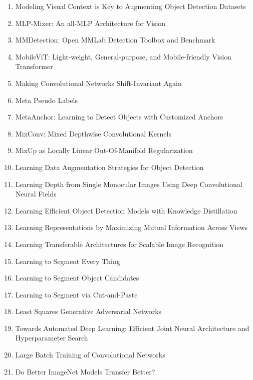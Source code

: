 \documentclass[acmlarge]{acmart}
\begin{document}
\begin{enumerate}
	\item Modeling Visual Context is Key to Augmenting Object Detection Datasets \cite{Dvornik2018ModelingVC}
	\item MLP-Mixer: An all-MLP Architecture for Vision \cite{Tolstikhin2021MLPMixerAA}
	\item MMDetection: Open MMLab Detection Toolbox and Benchmark \cite{Chen2019MMDetectionOM}
	\item MobileViT: Light-weight, General-purpose, and Mobile-friendly Vision Transformer \cite{Mehta2021MobileViTLG}
	\item Making Convolutional Networks Shift-Invariant Again \cite{Zhang2019MakingCN}
	\item Meta Pseudo Labels \cite{Pham2021MetaPL}
	\item MetaAnchor: Learning to Detect Objects with Customized Anchors \cite{Yang2018MetaAnchorLT}
	\item MixConv: Mixed Depthwise Convolutional Kernels \cite{Tan2019MixConvMD}
	\item MixUp as Locally Linear Out-Of-Manifold Regularization \cite{Guo2019MixUpAL}
	\item Learning Data Augmentation Strategies for Object Detection \cite{Zoph2020LearningDA}
	\item Learning Depth from Single Monocular Images Using Deep Convolutional Neural Fields \cite{Liu2016LearningDF}
	\item Learning Efficient Object Detection Models with Knowledge Distillation \cite{Chen2017LearningEO}
	\item Learning Representations by Maximizing Mutual Information Across Views \cite{Bachman2019LearningRB}
	\item Learning Transferable Architectures for Scalable Image Recognition \cite{Zoph2018LearningTA}
	\item Learning to Segment Every Thing \cite{Hu2018LearningTS}
	\item Learning to Segment Object Candidates \cite{Pinheiro2015LearningTS}
	\item Learning to Segment via Cut-and-Paste \cite{Remez2018LearningTS}
	\item Least Squares Generative Adversarial Networks \cite{Mao2017LeastSG}
	\item Towards Automated Deep Learning: Efficient Joint Neural Architecture and Hyperparameter Search \cite{Zela2018TowardsAD}
	\item Large Batch Training of Convolutional Networks \cite{You2017LargeBT}
	\item Do Better ImageNet Models Transfer Better? \cite{Kornblith2019DoBI}

\end{enumerate}
\end{document}
